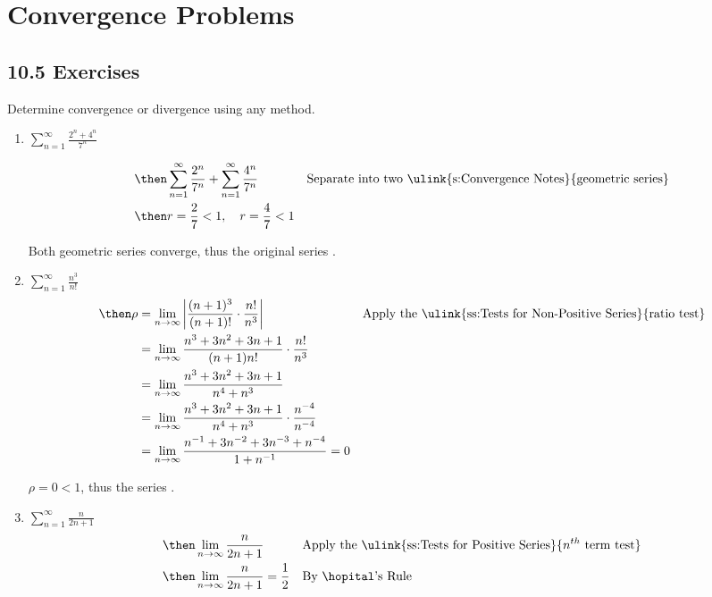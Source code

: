\newpage %

\section{Convergence Problems}

\subsection{10.5 Exercises}
Determine convergence or divergence using any method.
\vspace{1em}
\begin{enumerate}[itemsep=12em]
  \item \(\displaystyle \sum_{n=1}^{\infty} \frac{2^n + 4^n }{7^n}\)

    \begin{align*}
      &\then
      \sum_{n=1}^{\infty} \frac{2^n}{7^n} +
      \sum_{n=1}^{\infty} \frac{4^n }{7^n}
      && \text{Separate into two \ulink{s:Convergence Notes}{geometric series}} \\
      &\then
      r = \frac{2}{7} < 1, \quad r = \frac{4}{7} < 1
    \end{align*}

    Both geometric series converge, thus the original series .

  \vspace{-64pt}
  \item \(\displaystyle \sum_{n=1}^{\infty} \frac{n^3}{n!} \)
    \begin{align*}
      \then \rho &= \lim_{n \to \infty} \left| \frac{(n+1)^3}{(n+1)!} \cdot
      \frac{n!}{n^3} \right|
      && \text{Apply the \ulink{ss:Tests for Non-Positive Series}{ratio test}} \\
       &= \lim_{n \to \infty} \frac{n^3 + 3n^2 + 3n + 1}{(n+1)n!} \cdot
      \frac{n!}{n^3} \\
       &= \lim_{n \to \infty} \frac{n^3 + 3n^2 + 3n + 1}{n^4+n^3} \\
       &= \lim_{n \to \infty} \frac{n^3 + 3n^2 + 3n + 1}{n^4+n^3} \cdot \frac{n^{-4}}{n^{-4}}\\
       &= \lim_{n \to \infty} \frac{n^{-1}  + 3n^{-2} + 3n^{-3}  + n^{-4} }{1+n^{-1} } = 0
    \end{align*}

    \(\rho = 0 < 1\), thus the series .

  \vspace{-32pt}
  \item \(\displaystyle \sum_{n=1}^{\infty} \frac{n}{2n+1} \)
    \begin{align*}
      &\then \lim_{n \to \infty} \frac{n}{2n+1}
      && \text{Apply the \ulink{ss:Tests for Positive Series}{\(n^{th} \) term test}} \\
      &\then \lim_{n \to \infty} \frac{n}{2n+1} = \frac{1}{2}
      && \text{By \hopital's Rule}
    \end{align*}


\end{enumerate}
